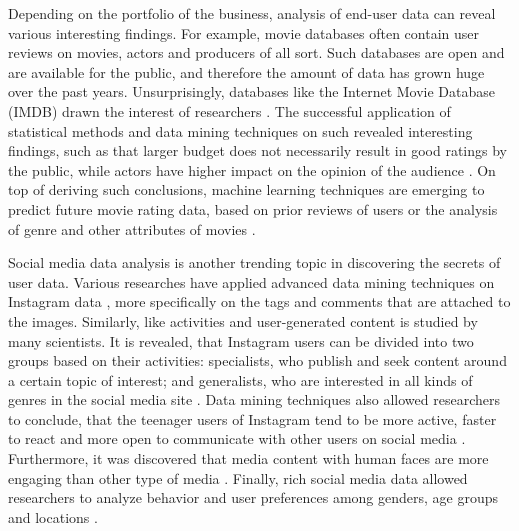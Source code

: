    Depending on the portfolio of the business, analysis of end-user data can reveal various interesting findings. For example, movie databases often contain user reviews on movies, actors and producers of all sort. Such databases are open and are available for the public, and therefore the amount of data has grown huge over the past years. Unsurprisingly, databases like the Internet Movie Database (IMDB) drawn the interest of researchers \cite{saraee2004data, kabinsingha2012movie, sumathi2013performance}. The successful application of statistical methods and data mining techniques on such revealed interesting findings, such as that larger budget does not necessarily result in good ratings by the public, while actors have higher impact on the opinion of the audience \cite{saraee2004data}. On top of deriving such conclusions, machine learning techniques are emerging to predict future movie rating data, based on prior reviews of users \cite{saraee2004data} or the analysis of genre and other attributes of movies \cite{kabinsingha2012movie}.

    Social media data analysis is another trending topic in discovering the secrets of user data. Various researches have applied advanced data mining techniques on Instagram data \cite{jang2015noreciprocity, bakhshi2014faces, hu2014we, jang2016teensengagemorewithfewerphotos, han2016teensarefrommars}, more specifically on the tags and comments that are attached to the images. Similarly, like activities and user-generated content is studied by many scientists. It is revealed, that Instagram users can be divided into two groups based on their activities: specialists, who publish and seek content around a certain topic of interest; and generalists, who are interested in all kinds of genres in the social media site \cite{jang2015noreciprocity}. Data mining techniques also allowed researchers to conclude, that the teenager users of Instagram tend to be more active, faster to react and more open to communicate with other users on social media \cite{jang2016teensengagemorewithfewerphotos, han2016teensarefrommars}. Furthermore, it was discovered that media content with human faces are more engaging than other type of media \cite{bakhshi2014faces}. Finally, rich social media data allowed researchers to analyze behavior and user preferences among genders, age groups and locations \cite{farseev2015harvestingmultiplesources}.

